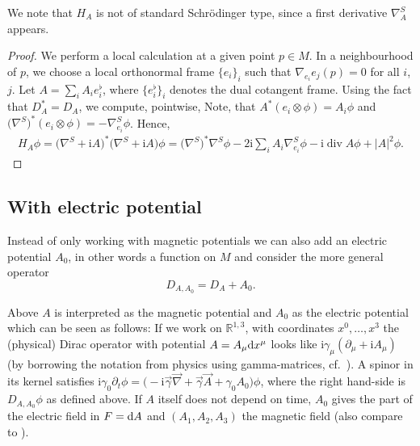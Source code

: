 \documentclass[pdftex]{sigma}
\numberwithin{equation}{section}
\begin{document}
We note that $H_A$ is not of standard Schr\"odinger type, since a first derivative $\nabla_A^S$ appears.
\begin{proof}We perform a local calculation at a given point $p\in M$. In a neighbourhood of $p$, we choose a local orthonormal frame $\{e_i\}_i$ such that $\nabla_{e_i}e_j(p)=0$ for all $i$, $j$.
Let $A=\sum_i A_i e_i^\flat$, where $\bigl\{e_i^\flat\bigr\}_i$ denotes the dual cotangent frame. Using the fact that $D_A^*=D_A$, we compute, pointwise,
Note, that $A^*(e_i\otimes \phi)= A_i\phi$ and $\bigl(\nabla^S\bigr)^*(e_i\otimes \phi)=-\nabla^S_{e_i}\phi$. Hence,
\begin{align*}
H_{A}\phi = \bigl(\nabla^S + {\mathrm{i}}A\bigr)^*\bigl(\nabla^S + {\mathrm{i}}A \bigr) \phi
= \bigl(\nabla^S\bigr)^*\nabla^S\phi -2{\mathrm{i}}\sum_i A_i \nabla^S_{e_i}\phi -{\mathrm{i}}\operatorname{div} A \phi +|A|^2\phi. \tag*{\qed}
\end{align*}\renewcommand{\qed}{}
\end{proof}

\subsection{With electric potential}
Instead of only working with magnetic potentials we can also add an electric potential $A_0$, in other words a function on $M$ and consider the more general operator
\[ D_{A, A_0}=D_A+A_0.\]
\begin{Remark}\label{rem_pot_types}
Above $A$ is interpreted as the magnetic potential and $A_0$ as the electric potential which can be seen as follows: If we work on ${\mathbb R}^{1,3}$, with coordinates $x^0, \ldots, x^3$ the (physical) Dirac operator with potential $A=A_\mu {\rm d}x^\mu$ looks like ${\mathrm{i}}\gamma_\mu (\partial_\mu + {\mathrm{i}}A_\mu)$ (by borrowing the notation from physics using gamma-matrices, cf.\ \cite{Thaller}). A spinor in its kernel satisfies ${\mathrm{i}}\gamma_0 \partial_t \phi = \bigl(-{\mathrm{i}} \vec{\gamma}\vec{\nabla} + \vec{\gamma} \vec{A} + \gamma_0A_0\bigr)\phi$, where the right hand-side is $D_{A,A_0}\phi$ as defined above. If $A$ itself does not depend on time, $A_0$ gives the part of the electric field in $F={\rm d}A$ and $(A_1, A_2, A_3)$ the magnetic field (also compare to \cite[Section~4.2]{Thaller}).
\end{Remark}
\end{document}
